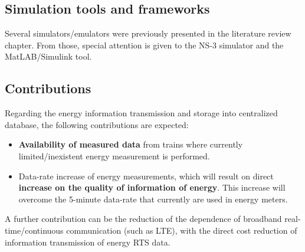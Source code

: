 \subsection{Simulation tools and frameworks}

Several simulators/emulators were previously presented in the literature review chapter. From those, special attention is given to the NS-3 simulator and the MatLAB/Simulink tool.  


\subsection{Contributions}

Regarding the energy information transmission and storage into centralized database, the following contributions are expected:

\begin{itemize}
	\setlength\itemsep{0em}
	
	\item \textbf{Availability of measured data} from trains where currently limited/inexistent energy measurement is performed.
	
	\item Data-rate increase of energy measurements, which will result on direct \textbf{increase on the quality of information of energy}. This increase will overcome the 5-minute data-rate that currently are used in energy meters.
	
\end{itemize}

A further contribution can be the reduction of the dependence of broadband real-time/continuous communication (such as \ac{LTE}), with the direct cost reduction of information transmission of energy \ac{RTS} data.

	
	
